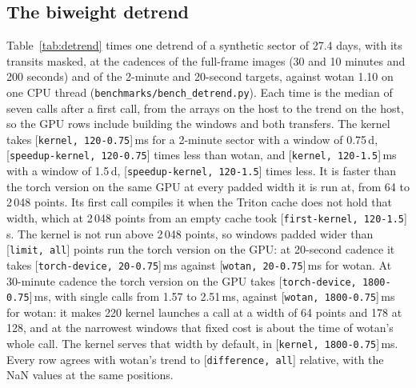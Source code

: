 \documentclass{aastex631}
\providecommand{\Dt}[2]{[\texttt{#1, #2}]}
\begin{document}
\subsection{The biweight detrend}\label{sec:detrendtime}
Table~\ref{tab:detrend} times one detrend of a synthetic sector of 27.4 days, with its transits masked, at the cadences of the full-frame images (30 and 10 minutes and 200 seconds) and of the 2-minute and 20-second targets, against wotan 1.10 on one CPU thread (\texttt{benchmarks/bench\_detrend.py}). Each time is the median of seven calls after a first call, from the arrays on the host to the trend on the host, so the GPU rows include building the windows and both transfers. The kernel takes \Dt{kernel}{120-0.75}\,ms for a 2-minute sector with a window of 0.75\,d, \Dt{speedup-kernel}{120-0.75} times less than wotan, and \Dt{kernel}{120-1.5}\,ms with a window of 1.5\,d, \Dt{speedup-kernel}{120-1.5} times less. It is faster than the torch version on the same GPU at every padded width it is run at, from 64 to 2\,048 points. Its first call compiles it when the Triton cache does not hold that width, which at 2\,048 points from an empty cache took \Dt{first-kernel}{120-1.5}\,s. The kernel is not run above 2\,048 points, so windows padded wider than \Dt{limit}{all} points run the torch version on the GPU: at 20-second cadence it takes \Dt{torch-device}{20-0.75}\,ms against \Dt{wotan}{20-0.75}\,ms for wotan. At 30-minute cadence the torch version on the GPU takes \Dt{torch-device}{1800-0.75}\,ms, with single calls from 1.57 to 2.51\,ms, against \Dt{wotan}{1800-0.75}\,ms for wotan: it makes 220 kernel launches a call at a width of 64 points and 178 at 128, and at the narrowest windows that fixed cost is about the time of wotan's whole call. The kernel serves that width by default, in \Dt{kernel}{1800-0.75}\,ms. Every row agrees with wotan's trend to \Dt{difference}{all} relative, with the NaN values at the same positions.
\end{document}
